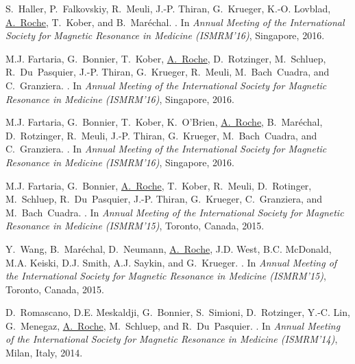 \begin{thebibliography}{100}
S.~Haller, P.~Falkovskiy, R.~Meuli, J.-P. Thiran, G.~Krueger, K.-O. Lovblad,
  \underline{A.~Roche}, T.~Kober, and B.~Mar\'echal.
.
\newblock In {\em Annual Meeting of the International Society for Magnetic
  Resonance in Medicine (ISMRM'16)}, Singapore, 2016.

M.J. Fartaria, G.~Bonnier, T.~Kober, \underline{A.~Roche}, D.~Rotzinger, M.~Schluep,
  R.~Du~Pasquier, J.-P. Thiran, G.~Krueger, R.~Meuli, M.~Bach~Cuadra, and
  C.~Granziera.
.
\newblock In {\em Annual Meeting of the International Society for Magnetic
  Resonance in Medicine (ISMRM'16)}, Singapore, 2016.

M.J. Fartaria, G.~Bonnier, T.~Kober, K.~O'Brien, \underline{A.~Roche}, B.~Mar\'echal,
  D.~Rotzinger, R.~Meuli, J.-P. Thiran, G.~Krueger, M.~Bach~Cuadra, and
  C.~Granziera.
.
\newblock In {\em Annual Meeting of the International Society for Magnetic
  Resonance in Medicine (ISMRM'16)}, Singapore, 2016.

M.J. Fartaria, G.~Bonnier, \underline{A.~Roche}, T.~Kober, R.~Meuli, D.~Rotinger,
  M.~Schluep, R.~Du~Pasquier, J.-P. Thiran, G.~Krueger, C.~Granziera, and
  M.~Bach~Cuadra.
.
\newblock In {\em Annual Meeting of the International Society for Magnetic
  Resonance in Medicine (ISMRM'15)}, Toronto, Canada, 2015.

Y.~Wang, B.~Mar\'echal, D.~Neumann, \underline{A.~Roche}, J.D. West, B.C. McDonald, M.A.
  Keiski, D.J. Smith, A.J. Saykin, and G.~Krueger.
.
\newblock In {\em Annual Meeting of the International Society for Magnetic
  Resonance in Medicine (ISMRM'15)}, Toronto, Canada, 2015.

D.~Romascano, D.E. Meskaldji, G.~Bonnier, S.~Simioni, D.~Rotzinger, Y.-C. Lin,
  G.~Menegaz, \underline{A.~Roche}, M.~Schluep, and R.~Du~Pasquier.
.
\newblock In {\em Annual Meeting of the International Society for Magnetic
  Resonance in Medicine (ISMRM'14)}, Milan, Italy, 2014.


\end{thebibliography}
